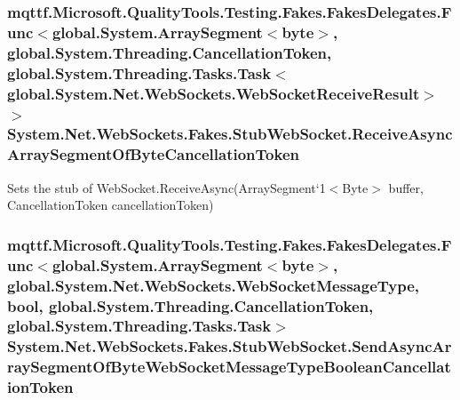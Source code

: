 \hypertarget{class_system_1_1_net_1_1_web_sockets_1_1_fakes_1_1_stub_web_socket_a555f1608ea2863b7db11c29a3842883a}{
\subsubsection[{Receive\-Async\-Array\-Segment\-Of\-Byte\-Cancellation\-Token}]{\setlength{\rightskip}{0pt plus 5cm}mqttf.\-Microsoft.\-Quality\-Tools.\-Testing.\-Fakes.\-Fakes\-Delegates.\-Func$<$global.\-System.\-Array\-Segment$<$byte$>$, global.\-System.\-Threading.\-Cancellation\-Token, global.\-System.\-Threading.\-Tasks.\-Task$<$global.\-System.\-Net.\-Web\-Sockets.\-Web\-Socket\-Receive\-Result$>$ $>$ System.\-Net.\-Web\-Sockets.\-Fakes.\-Stub\-Web\-Socket.\-Receive\-Async\-Array\-Segment\-Of\-Byte\-Cancellation\-Token}}\label{class_system_1_1_net_1_1_web_sockets_1_1_fakes_1_1_stub_web_socket_a555f1608ea2863b7db11c29a3842883a}


Sets the stub of Web\-Socket.\-Receive\-Async(Array\-Segment`1$<$Byte$>$ buffer, Cancellation\-Token cancellation\-Token)

\hypertarget{class_system_1_1_net_1_1_web_sockets_1_1_fakes_1_1_stub_web_socket_a43296b380df149ebce54e12caefe5245}{
\subsubsection[{Send\-Async\-Array\-Segment\-Of\-Byte\-Web\-Socket\-Message\-Type\-Boolean\-Cancellation\-Token}]{\setlength{\rightskip}{0pt plus 5cm}mqttf.\-Microsoft.\-Quality\-Tools.\-Testing.\-Fakes.\-Fakes\-Delegates.\-Func$<$global.\-System.\-Array\-Segment$<$byte$>$, global.\-System.\-Net.\-Web\-Sockets.\-Web\-Socket\-Message\-Type, bool, global.\-System.\-Threading.\-Cancellation\-Token, global.\-System.\-Threading.\-Tasks.\-Task$>$ System.\-Net.\-Web\-Sockets.\-Fakes.\-Stub\-Web\-Socket.\-Send\-Async\-Array\-Segment\-Of\-Byte\-Web\-Socket\-Message\-Type\-Boolean\-Cancellation\-Token}}\label{class_system_1_1_net_1_1_web_sockets_1_1_fakes_1_1_stub_web_socket_a43296b380df149ebce54e12caefe5245}


